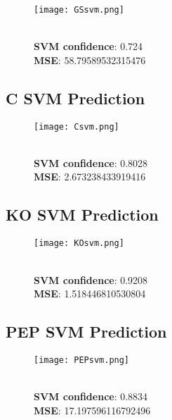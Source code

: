 \documentclass{report}
\begin{document}
\begin{figure}[h]
    \centering
    \texttt{[image: GSsvm.png]}
    \caption{\\ \textbf{SVM confidence}:  0.724 \\ \textbf{MSE}:  58.79589532315476}
\end{figure}

\subsection{C SVM Prediction}

\begin{figure}[h]
    \centering
    \texttt{[image: Csvm.png]}
    \caption{\\ \textbf{SVM confidence}:  0.8028 \\ \textbf{MSE}:  2.673238433919416}
\end{figure}\newpage

\subsection{KO SVM Prediction}

\begin{figure}[h]
    \centering
    \texttt{[image: KOsvm.png]}
    \caption{\\ \textbf{SVM confidence}:  0.9208 \\ \textbf{MSE}:  1.518446810530804}
\end{figure}

\subsection{PEP SVM Prediction}

\begin{figure}[h]
    \centering
    \texttt{[image: PEPsvm.png]}
    \caption{\\ \textbf{SVM confidence}:  0.8834 \\ \textbf{MSE}:  17.197596116792496}
\end{figure}

\end{document}
